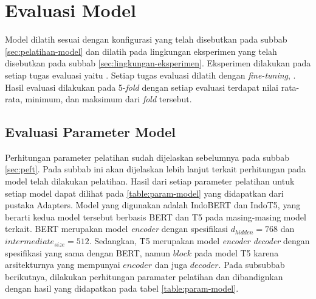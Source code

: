 \section{Evaluasi Model}

Model dilatih sesuai dengan konfigurasi yang telah disebutkan pada subbab \ref{sec:pelatihan-model} dan dilatih pada lingkungan eksperimen yang telah disebutkan pada subbab \ref{sec:lingkungan-eksperimen}. Eksperimen dilakukan pada setiap tugas evaluasi yaitu \nlptask. Setiap tugas evaluasi dilatih dengan \textit{fine-tuning}, \methodPEFT. Hasil evaluasi dilakukan pada 5-\textit{fold} dengan setiap evaluasi terdapat nilai rata-rata, minimum, dan maksimum dari \textit{fold} tersebut.

\subsection{Evaluasi Parameter Model}

Perhitungan parameter pelatihan sudah dijelaskan sebelumnya pada subbab \ref{sec:peft}. Pada subbab ini akan dijelaskan lebih lanjut terkait perhitungan pada model telah dilakukan pelatihan. Hasil dari setiap parameter pelatihan untuk setiap model dapat dilihat pada \ref{table:param-model} yang didapatkan dari pustaka Adapters. Model yang digunakan adalah IndoBERT dan IndoT5, yang berarti kedua model tersebut berbasis BERT dan T5 pada masing-masing model terkait. BERT merupakan model \textit{encoder} dengan spesifikasi $d_{hidden} = 768$ dan $intermediate_{size} = 512$. Sedangkan, T5 merupakan model \textit{encoder decoder} dengan spesifikasi yang sama dengan BERT, namun $block$ pada model T5 karena arsitekturnya yang mempunyai $encoder$ dan juga $decoder$. Pada subsubbab berikutnya, dilakukan perhitungan paramater pelatihan dan dibandignkan dengan hasil yang didapatkan pada tabel \ref{table:param-model}.

